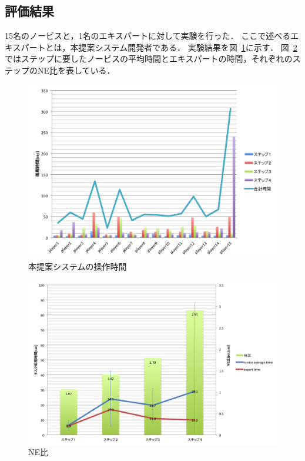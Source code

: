 \documentclass[sotsuron]{kuee}
\begin{document}
		\subsection{評価結果}
			15名のノービスと，1名のエキスパートに対して実験を行った．
			ここで述べるエキスパートとは，本提案システム開発者である．
			実験結果を図~\ref{fig:result01}に示す．
			図~\ref{fig:result02}ではステップに要したノービスの平均時間とエキスパートの時間，それぞれのステップのNE比を表している．
			\begin{figure}
				\begin{center}
					\includegraphics[width=\linewidth]{./png/result01.png}
				\end{center}
				\caption{本提案システムの操作時間}
		  		\label{fig:result01}
			\end{figure}
			\begin{figure}
				\begin{center}
					\includegraphics[width=\linewidth]{./png/result02.png}
				\end{center}
				\caption{NE比}
		  		\label{fig:result02}
			\end{figure}
\end{document}
